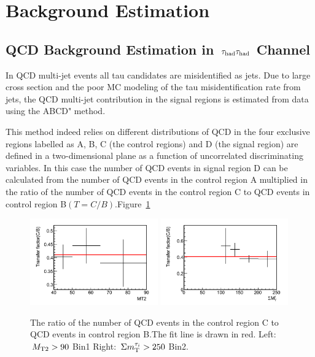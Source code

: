 \section{Background Estimation}
\subsection{\texorpdfstring{QCD Background Estimation in $\,\tau_{\rm had}\tau_{\rm had}$ Channel}{QCD Background Estimation in tau-tau Channel}}
\label{sect:bkg}


In QCD multi-jet events all tau candidates are misidentified as jets. Due to large cross
section and
the poor MC modeling of the tau misidentification rate from jets, the QCD multi-jet contribution in the signal regions is estimated from data using the ABCD" method.

This method indeed relies on different distributions of QCD
in the four exclusive regions labelled as A, B, C (the control regions) and D (the signal region) are defined in a two-dimensional plane as a function of uncorrelated discriminating variables.
In this case the number of QCD events in signal region D can be calculated from the number of QCD events in the control region A multiplied in the ratio of the number of QCD events in the control region C to QCD events in control region B$(T=C/B)$.Figure~\ref{fig:1QCDbg} 

\begin{figure}[htbp]
\centering
\includegraphics[width=0.49\textwidth]{QCDbginTauTau/Bin1_transferfactor.png}
\includegraphics[width=0.49\textwidth]{QCDbginTauTau/Bin2_transferfactor.png} \\
\caption{The ratio of the number of QCD events in the control region C to QCD events in control region B.The
fit line  is drawn in red.
 Left:  $\,{M_{\rm T2}}>90$ Bin1   Right:  $\,\Sigma m_{\rm T}^{\tau_i} >250$ Bin2.}
\label{fig:1QCDbg}
\end{figure}

